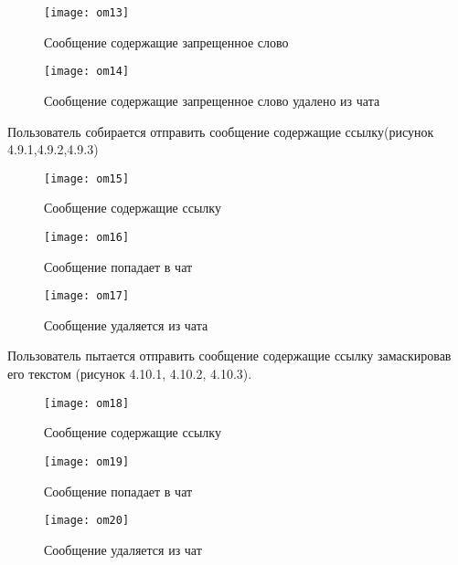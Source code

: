 \begin{figure}
	\centering
	\texttt{[image: om13]}
	\caption{Сообщение содержащие запрещенное слово}
	\label{om13:image}
\end{figure}

\begin{figure}
	\centering
	\texttt{[image: om14]}
	\caption{Сообщение содержащие запрещенное слово удалено из чата}
	\label{om14:image}
\end{figure}
Пользователь собирается отправить сообщение содержащие ссылку(рисунок 4.9.1,4.9.2,4.9.3)
\begin{figure}
	\centering
	\texttt{[image: om15]}
	\caption{Сообщение содержащие ссылку}
	\label{om15:image}
\end{figure}

\begin{figure}
	\centering
	\texttt{[image: om16]}
	\caption{Сообщение попадает в чат}
	\label{om16:image}
\end{figure}

\begin{figure}
	\centering
	\texttt{[image: om17]}
	\caption{Сообщение удаляется из чата}
	\label{om17:image}
\end{figure}
Пользователь пытается отправить сообщение содержащие ссылку замаскировав его текстом (рисунок 4.10.1, 4.10.2, 4.10.3).

\begin{figure}
	\centering
	\texttt{[image: om18]}
	\caption{Сообщение содержащие ссылку}
	\label{om18:image}
\end{figure}

\begin{figure}
	\centering
	\texttt{[image: om19]}
	\caption{Сообщение попадает в чат}
	\label{om19:image}
\end{figure}

\begin{figure}
	\centering
	\texttt{[image: om20]}
	\caption{Сообщение удаляется из чат}
	\label{om20:image}
\end{figure}

